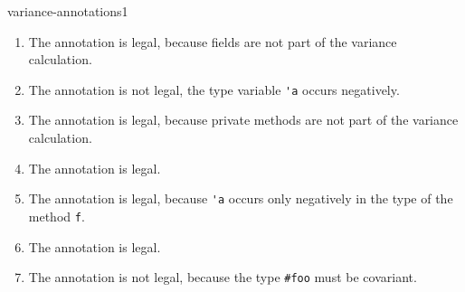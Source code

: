 \begin{exercise}{variance-annotations1}
\begin{enumerate}
\end{enumerate}

\begin{answer}\ifanswers
\begin{enumerate}
\item The annotation is legal, because fields are not part of the variance calculation.
\item The annotation is not legal, the type variable \hbox{\lstinline$'a$} occurs negatively.
\item The annotation is legal, because private methods are not part of the variance calculation.
\item The annotation is legal.
\item The annotation is legal, because \hbox{\lstinline$'a$} occurs only negatively in the type of the method \hbox{\lstinline$f$}.
\item The annotation is legal.
\item The annotation is not legal, because the type \hbox{\lstinline$#foo$} must be covariant.
\end{enumerate}
\fi\end{answer}
\end{exercise}


